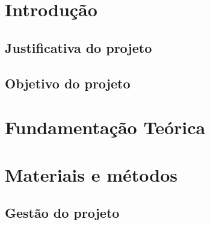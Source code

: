 \chapter{Introdução}
\section{Justificativa do projeto}


\section{Objetivo do projeto}



\chapter{Fundamentação Teórica}


\chapter{Materiais e métodos}


\section{Gestão do projeto}


